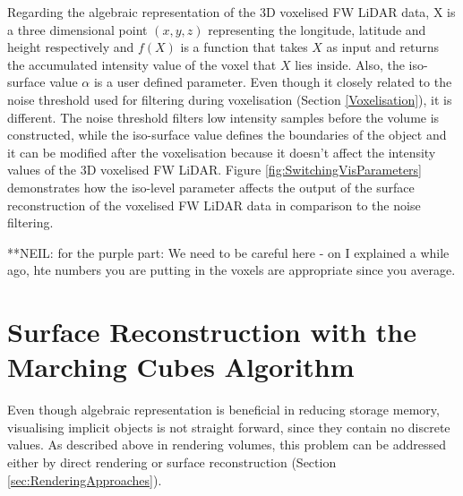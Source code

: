 \documentclass{subfiles}
\begin{document}
\par Regarding the algebraic representation of the 3D voxelised FW LiDAR data, X is a three dimensional point $\mathit{(x, y, z) }$ representing the longitude, latitude and height respectively and ${f(X)}$ is a function that takes  $\mathit{X}$ as input and returns the accumulated intensity value of the voxel that  $\mathit{X}$ lies inside. {\color{Fuchsia} Also, the iso-surface value $\mathit{\alpha }$ is a user defined parameter. Even though it closely related to the noise threshold used for filtering during voxelisation (Section \ref{Voxelisation}), it is different. The noise threshold filters low intensity samples before the volume is constructed, while the iso-surface value defines the boundaries of the object and it can be modified after the voxelisation because it doesn't affect the intensity values of the 3D voxelised FW LiDAR. Figure \ref{fig:SwitchingVisParameters} demonstrates how the iso-level parameter affects the output of the surface reconstruction of the voxelised FW LiDAR data in comparison to the noise filtering}.

{\color{red} **NEIL: for the purple part: We need to be careful here - on I explained a while ago, hte numbers you are putting in the voxels are appropriate since you average. }


\section {Surface Reconstruction with the Marching Cubes Algorithm}\label{sec:SurfaceReconstruction}

\par Even though algebraic representation is beneficial in reducing storage memory, visualising implicit objects is not straight forward, since they contain no discrete values. As described above in rendering volumes, this problem can be addressed either by direct rendering or surface reconstruction (Section \ref{sec:RenderingApproaches}). 
\end{document}
